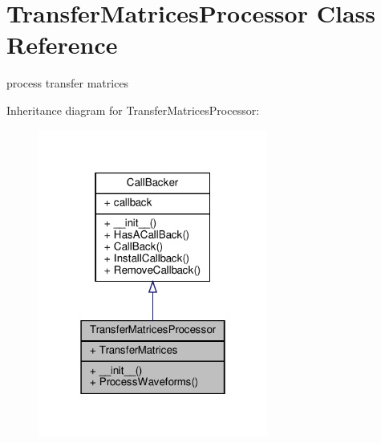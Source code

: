 \hypertarget{classSignalIntegrity_1_1TimeDomain_1_1Filters_1_1TransferMatricesProcessor_1_1TransferMatricesProcessor}{}\section{Transfer\+Matrices\+Processor Class Reference}
\label{classSignalIntegrity_1_1TimeDomain_1_1Filters_1_1TransferMatricesProcessor_1_1TransferMatricesProcessor}


process transfer matrices  




Inheritance diagram for Transfer\+Matrices\+Processor\+:
\nopagebreak
\begin{figure}[H]
\begin{center}
\leavevmode
\includegraphics[width=214pt]{classSignalIntegrity_1_1TimeDomain_1_1Filters_1_1TransferMatricesProcessor_1_1TransferMatricesProcessor__inherit__graph}
\end{center}
\end{figure}


